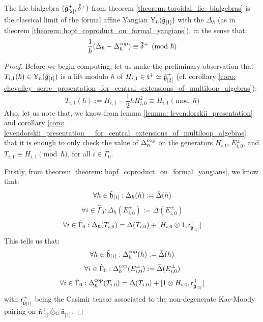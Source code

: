         \begin{theorem} \label{theorem: toroidal_lie_algebras_as_classical_limits_of_formal_affine_yangians}
           The Lie bialgebra $(\tilde{\mathfrak{g}}_{[2]}^+, \tilde{\delta}^+)$ from theorem \ref{theorem: toroidal_lie_bialgebras} is the classical limit of the formal affine Yangian $\mathrm{Y}_{\hbar}(\hat{\mathfrak{g}}_{[1]})$ with the  $\Delta_{\hbar}$ (as in theorem \ref{theorem: hopf_coproduct_on_formal_yangians}), in the sense that:
                $$\frac{1}{\hbar}( \Delta_{\hbar} - \Delta_{\hbar}^{\mathrm{cop}} ) \equiv \tilde{\delta}^+ \pmod{\hbar}$$
        \end{theorem}
            \begin{proof}
                Before we begin computing, let us make the preliminary observation that $T_{i, 1}(\hbar) \in \mathrm{Y}_{\hbar}(\hat{\mathfrak{g}}_{[1]})$ is a lift modulo $\hbar$ of $H_{i, 1} \in \mathfrak{t}^+ \simeq \tilde{\mathfrak{g}}_{[2]}^+$ (cf. corollary \ref{coro: chevalley_serre_presentation_for_central_extensions_of_multiloop_algebras}):
                    $$T_{i, 1}(\hbar) := H_{i, 1} - \frac12 \hbar H_{i, 0}^2 \equiv H_{i, 1} \pmod{\hbar}$$
                Also, let us note that, we know from lemma \ref{lemma: levendorskii_presentation} and corollary \ref{coro: levendorskii_presentation__for_central_extensions_of_multiloop_algebras} that it is enough to only check the value of $\Delta_{\hbar}^{\mathrm{cop}}$ on the generators $H_{i, 0}, E_{i, 0}^{\pm}$, and $T_{i, 1} \equiv H_{i, 1} \pmod{\hbar}$, for all $i \in \hat{\Gamma}_0$.
            
                Firstly, from theorem \ref{theorem: hopf_coproduct_on_formal_yangians}, we know that:
                    $$\forall h \in \hat{\mathfrak{h}}_{[1]}: \Delta_{\hbar}(h) := \bar{\Delta}(h)$$
                    $$\forall i \in \hat{\Gamma}_0: \Delta_{\hbar}(E_{i, 0}^{\pm}) := \bar{\Delta}(E_{i, 0}^{\pm})$$
                    $$\forall i \in \hat{\Gamma}_0: \Delta_{\hbar}(T_{i, 0}) = \bar{\Delta}(T_{i, 0}) + [H_{i, 0} \tensor 1, \sfr_{ \hat{\g}_{[1]} }^-]$$
                This tells us that:
                    $$\forall h \in \hat{\mathfrak{h}}_{[1]}: \Delta_{\hbar}^{\mathrm{cop}}(h) := \bar{\Delta}(h)$$
                    $$\forall i \in \hat{\Gamma}_0: \Delta_{\hbar}^{\mathrm{cop}}(E_{i, 0}^{\pm}) := \bar{\Delta}(E_{i, 0}^{\pm})$$
                    $$\forall i \in \hat{\Gamma}_0: \Delta_{\hbar}^{\cop}(T_{i, 0}) = \bar{\Delta}(T_{i, 0}) + [1 \tensor H_{i, 0}, \sfr_{ \hat{\g}_{[1]} }^+]$$
                with $\mathsf{r}_{\hat{\mathfrak{g}}_{[1]}}^+$ being the Casimir tensor associated to the non-degenerate Kac-Moody pairing on $\hat{\n}_{[1]}^+ \hattensor_{\bbC} \hat{\n}_{[1]}^-$.


\end{proof}
